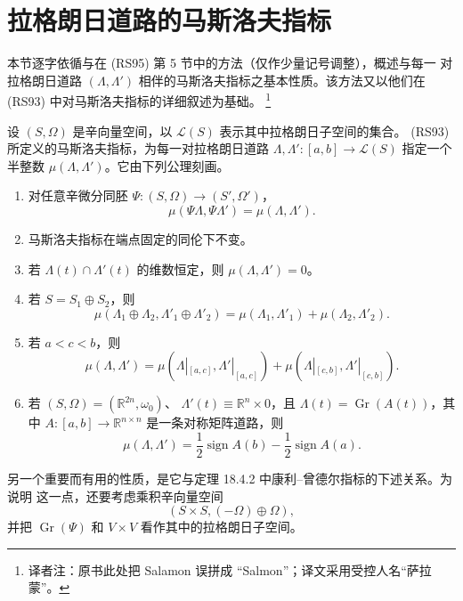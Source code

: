 \section{拉格朗日道路的马斯洛夫指标}
\label{sec:app-c-maslov-paths}

本节逐字依循\personRobbin{}与\personSalamon{}在 (RS95) 第 5 节中的方法（仅作少量记号调整），概述与每一
对拉格朗日道路 $(\Lambda,\Lambda')$ 相伴的马斯洛夫指标之基本性质。该方法又以他们在
(RS93) 中对马斯洛夫指标的详细叙述为基础。
\footnote{译者注：原书此处把 Salamon 误拼成 ``Salmon''；译文采用受控人名“萨拉蒙”。}

设 $(S,\Omega)$ 是辛向量空间，以 $\mathcal L(S)$ 表示其中拉格朗日子空间的集合。
(RS93) 所定义的马斯洛夫指标，为每一对拉格朗日道路
$\Lambda,\Lambda'\colon[a,b]\to\mathcal L(S)$ 指定一个半整数
$\mu(\Lambda,\Lambda')$。它由下列公理刻画。

\begin{enumerate}[label=(\arabic*)]
\item {}对任意辛微分同胚
$\Psi\colon(S,\Omega)\to(S',\Omega')$，
\[
 \mu(\Psi\Lambda,\Psi\Lambda')=\mu(\Lambda,\Lambda').
\]

\item {}马斯洛夫指标在端点固定的同伦下不变。

\item {}若 $\Lambda(t)\cap\Lambda'(t)$ 的维数恒定，则
$\mu(\Lambda,\Lambda')=0$。

\item {}若 $S=S_1\oplus S_2$，则
\[
 \mu(\Lambda_1\oplus\Lambda_2,\Lambda'_1\oplus\Lambda'_2)
 =\mu(\Lambda_1,\Lambda'_1)+\mu(\Lambda_2,\Lambda'_2).
\]

\item {}若 $a<c<b$，则
\[
 \mu(\Lambda,\Lambda')
 =\mu(\Lambda|_{[a,c]},\Lambda'|_{[a,c]})
 +\mu(\Lambda|_{[c,b]},\Lambda'|_{[c,b]}).
\]

\item {}若
$(S,\Omega)=(\mathbb R^{2n},\omega_0)$、
$\Lambda'(t)\equiv\mathbb R^n\times0$，且
$\Lambda(t)=\operatorname{Gr}(A(t))$，其中
$A\colon[a,b]\to\mathbb R^{n\times n}$ 是一条对称矩阵道路，则
\[
 \mu(\Lambda,\Lambda')
 =\frac12\operatorname{sign}A(b)-\frac12\operatorname{sign}A(a).
\]
\end{enumerate}

另一个重要而有用的性质，是它与定理 18.4.2 中康利--曾德尔指标的下述关系。为说明
这一点，还要考虑乘积辛向量空间
\[
 (S\times S,(-\Omega)\oplus\Omega),
\]
并把 $\operatorname{Gr}(\Psi)$ 和 $V\times V$ 看作其中的拉格朗日子空间。

